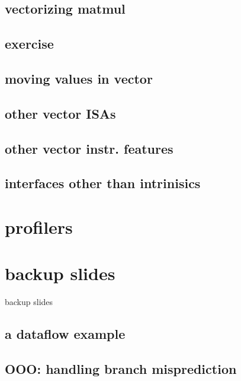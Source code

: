 \subsection{vectorizing matmul}


\subsection{exercise}


\subsection{moving values in vector}


\subsection{other vector ISAs}


\subsection{other vector instr. features}


\subsection{interfaces other than intrinisics}


\section{profilers}



\section{backup slides}
\begin{frame}{backup slides}
\end{frame}

\subsection{a dataflow example}


\subsection{OOO: handling branch misprediction}


